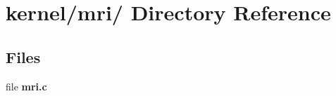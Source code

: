 \hypertarget{dir_000023}{
\section{kernel/mri/ Directory Reference}
\label{dir_000023}
}
\subsection*{Files}
\begin{CompactItemize}
\item 
file {\bf mri.c}
\end{CompactItemize}

